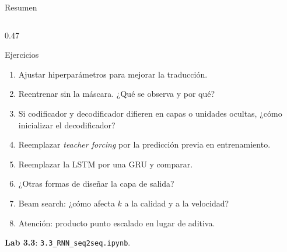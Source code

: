 \documentclass[aspectratio=169, 10pt]{beamer}
\begin{document}
\begin{frame}[shrink]{Resumen}
\begin{columns}[T]
		\begin{column}{0.47\textwidth}
			\begin{block}{Ejercicios}
				\small
				\begin{enumerate}
					\item Ajustar hiperpar\'ametros para mejorar la traducci\'on.
					\item Reentrenar sin la m\'ascara. ¿Qu\'e se observa y por qu\'e?
					\item Si codificador y decodificador difieren en capas o unidades ocultas, ¿c\'omo inicializar el decodificador?
					\item Reemplazar \emph{teacher forcing} por la predicci\'on previa en entrenamiento.
					\item Reemplazar la LSTM por una GRU y comparar.
					\item ¿Otras formas de dise\~nar la capa de salida?
					\item Beam search: ¿c\'omo afecta $k$ a la calidad y a la velocidad?
					\item Atenci\'on: producto punto escalado en lugar de aditiva.
				\end{enumerate}
			\end{block}
			\small
			\textbf{Lab 3.3}: \texttt{3.3\_RNN\_seq2seq.ipynb}.
		\end{column}
	\end{columns}

\end{frame}
\end{document}
